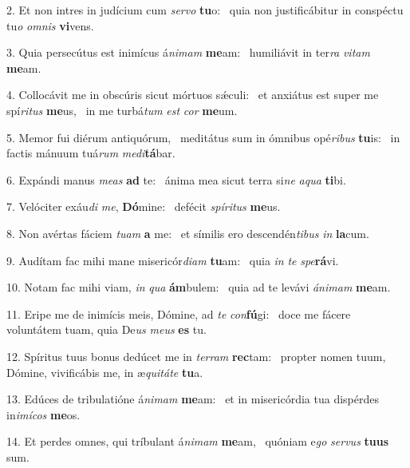 2. Et non intres in judícium cum \textit{ser}\textit{vo} \textbf{tu}o: \ast\  quia non justificábitur in conspéctu tu\textit{o} \textit{om}\textit{nis} \textbf{vi}vens.\

3. Quia persecútus est inimícus á\textit{ni}\textit{mam} \textbf{me}am: \ast\  humiliávit in ter\textit{ra} \textit{vi}\textit{tam} \textbf{me}am.\

4. Collocávit me in obscúris sicut mórtuos sǽculi: \dag\  et anxiátus est super me spí\textit{ri}\textit{tus} \textbf{me}us, \ast\  in me turbá\textit{tum} \textit{est} \textit{cor} \textbf{me}um.\

5. Memor fui diérum antiquórum, \dag\  meditátus sum in ómnibus opé\textit{ri}\textit{bus} \textbf{tu}is: \ast\  in factis mánuum tuá\textit{rum} \textit{me}\textit{di}\textbf{tá}bar.\

6. Expándi manus \textit{me}\textit{as} \textbf{ad} te: \ast\  ánima mea sicut terra si\textit{ne} \textit{a}\textit{qua} \textbf{ti}bi.\

7. Velóciter exáu\textit{di} \textit{me}, \textbf{Dó}mine: \ast\  defécit \textit{spí}\textit{ri}\textit{tus} \textbf{me}us.\

8. Non avértas fáciem \textit{tu}\textit{am} \textbf{a} me: \ast\  et símilis ero descendén\textit{ti}\textit{bus} \textit{in} \textbf{la}cum.\

9. Audítam fac mihi mane misericór\textit{di}\textit{am} \textbf{tu}am: \ast\  quia \textit{in} \textit{te} \textit{spe}\textbf{rá}vi.\

10. Notam fac mihi viam, \textit{in} \textit{qua} \textbf{ám}bulem: \ast\  quia ad te levávi \textit{á}\textit{ni}\textit{mam} \textbf{me}am.\

11. Eripe me de inimícis meis, Dómine, ad \textit{te} \textit{con}\textbf{fú}gi: \ast\  doce me fácere voluntátem tuam, quia De\textit{us} \textit{me}\textit{us} \textbf{es} tu.\

12. Spíritus tuus bonus dedúcet me in \textit{ter}\textit{ram} \textbf{rec}tam: \ast\  propter nomen tuum, Dómine, vivificábis me, in æ\textit{qui}\textit{tá}\textit{te} \textbf{tu}a.\

13. Edúces de tribulatióne á\textit{ni}\textit{mam} \textbf{me}am: \ast\  et in misericórdia tua dispérdes in\textit{i}\textit{mí}\textit{cos} \textbf{me}os.\

14. Et perdes omnes, qui tríbulant á\textit{ni}\textit{mam} \textbf{me}am, \ast\  quóniam e\textit{go} \textit{ser}\textit{vus} \textbf{tu}\textbf{us} sum.\

